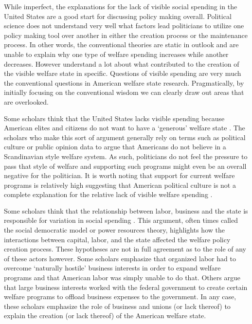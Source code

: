 \documentclass[12pt]{article}
\begin{document}
While imperfect, the explanations for the lack of visible social spending in the United States are a good start for discussing policy making overall. Political science does not understand very well what factors lead politicians to utilize one policy making tool over another in either the creation process or the maintenance process. In other words, the conventional theories are static in outlook and are unable to explain why one type of welfare spending increases while another decreases. However understand a lot about what contributed to the creation of the visible welfare state in specific. Questions of visible spending are very much the conventional questions in American welfare state research. Pragmatically, by initially focusing on the conventional wisdom we can clearly draw out areas that are overlooked.

Some scholars think that the United States lacks visible spending because American elites and citizens do not want to have a `generous' welfare state \citep{king1973}. The scholars who make this sort of argument generally rely on terms such as political culture or public opinion data to argue that Americans do not believe in a Scandinavian style welfare system. As such, politicians do not feel the pressure to pass that style of welfare and supporting such programs might even be an overall negative for the politician. It is worth noting that support for current welfare programs is relatively high suggesting that American political culture is not a complete explanation for the relative lack of visible welfare spending \citep[Ch. 6]{howard2008}.

Some scholars think that the relationship between labor, business and the state is responsible for variation in social spending \citep{korpi1980, swenson2004}. This argument, often times called the social democratic model or power resources theory, highlights how the interactions between capital, labor, and the state affected the welfare policy creation process. These hypotheses are not in full agreement as to the role of any of these actors however. Some scholars emphasize that organized labor had to overcome `naturally hostile' business interests in order to expand welfare programs and that American labor was simply unable to do that. Others argue that large business interests worked with the federal government to create certain welfare programs to offload business expenses to the government. In any case, these scholars emphasize the role of business and unions (or lack thereof) to explain the creation (or lack thereof) of the American welfare state. 
\end{document}
